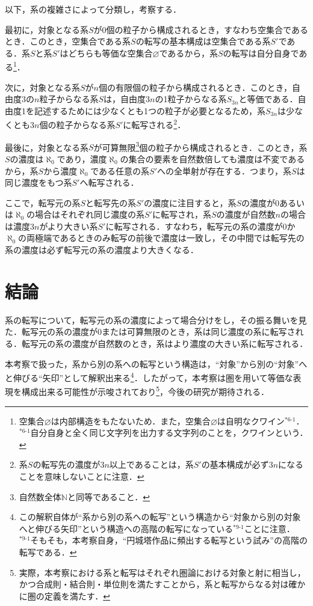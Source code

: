 \documentclass[10pt, a5paper, twoside]{jsarticle}
\theoremstyle{definition}
\begin{document}
			以下，系の複雑さによって分類し，考察する．


			最初に，対象となる系$S$が0個の粒子から構成されるとき，すなわち空集合であるとき．このとき，空集合である系$S$の転写の基本構成は空集合である系$S'$である．系$S$と系$S'$はどちらも等価な空集合$\varnothing$であるから，系$S$の転写は自分自身である\footnote{空集合$\varnothing$は内部構造をもたないため．また，空集合$\varnothing$は自明なクワイン$^{*6\text{-}1}$．\\$^{*6\text{-}1}$自分自身と全く同じ文字列を出力する文字列のことを，クワインという\cite{geb}．}．

			次に，対象となる系$S$が$n$個の有限個の粒子から構成されるとき．このとき，自由度3の$n$粒子からなる系$S$は，自由度$3n$の1粒子からなる系$S_{3n}$と等価である．自由度1を記述するためには少なくとも1つの粒子が必要となるため，系$S_{3n}$は少なくとも$3n$個の粒子からなる系$S'$に転写される\footnote{系$S$の転写先の濃度が$3n$以上であることは，系$S'$の基本構成が必ず$3n$になることを意味しないことに注意．}．

			最後に，対象となる系$S$が可算無限\footnote{自然数全体$\mathbb{N}$と同等であること．}個の粒子から構成されるとき．このとき，系$S$の濃度は$\aleph_0$であり，濃度$\aleph_0$の集合の要素を自然数倍しても濃度は不変であるから，系$S$から濃度$\aleph_0$である任意の系$S'$への全単射が存在する．つまり，系$S$は同じ濃度をもつ系$S'$へ転写される．

			ここで，転写元の系$S$と転写先の系$S'$の濃度に注目すると，系$S$の濃度が0あるいは$\aleph_0$の場合はそれぞれ同じ濃度の系$S'$に転写され，系$S$の濃度が自然数$n$の場合は濃度$3n$がより大きい系$S'$に転写される．すなわち，転写元の系の濃度が0か$\aleph_0$の両極端であるときのみ転写の前後で濃度は一致し，その中間では転写先の系の濃度は必ず転写元の系の濃度より大きくなる．

	\section{結論}

		系の転写について，転写元の系の濃度によって場合分けをし，その振る舞いを見た．転写元の系の濃度が0または可算無限のとき，系は同じ濃度の系に転写される．転写元の系の濃度が自然数のとき，系はより濃度の大きい系に転写される．

		本考察で扱った，系から別の系への転写という構造は，“対象”から別の“対象”へと伸びる“矢印”として解釈出来る\footnote{この解釈自体が“系から別の系への転写”という構造から“対象から別の対象へと伸びる矢印”という構造への高階の転写になっている$^{*9\text{-}1}$ことに注意．\\$^{*9\text{-}1}$そもそも，本考察自身，“円城塔作品に頻出する転写という試み”の高階の転写である．}．したがって，本考察は圏を用いて等価な表現を構成出来る可能性が示唆されており\footnote{実際，本考察における系と転写はそれぞれ圏論における対象と射に相当し，かつ合成則・結合則・単位則を満たすことから，系と転写からなる対は確かに圏の定義を満たす．}，今後の研究が期待される．
\end{document}
